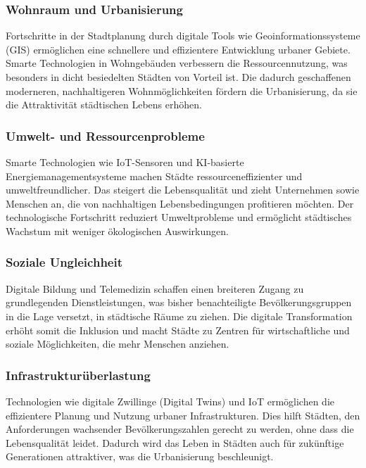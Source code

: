 \documentclass[conference,compsoc,final,a4paper, onecolumn, 11pt]{IEEEtran}
\begin{document}
\subsubsection{Wohnraum und Urbanisierung}
Fortschritte in der Stadtplanung durch digitale Tools wie Geoinformationssysteme (GIS) ermöglichen eine schnellere und effizientere Entwicklung urbaner Gebiete. 
Smarte Technologien in Wohngebäuden verbessern die Ressourcennutzung, was besonders in dicht besiedelten Städten von Vorteil ist. 
Die dadurch geschaffenen moderneren, nachhaltigeren Wohnmöglichkeiten fördern die Urbanisierung, da sie die Attraktivität städtischen Lebens erhöhen.\autocite{un_habitat_world_cities}

\subsubsection{ Umwelt- und Ressourcenprobleme}
Smarte Technologien wie \ac{IoT}-Sensoren und \ac{KI}-basierte Energiemanagementsysteme machen Städte ressourceneffizienter und umweltfreundlicher. 
Das steigert die Lebensqualität und zieht Unternehmen sowie Menschen an, die von nachhaltigen Lebensbedingungen profitieren möchten. 
Der technologische Fortschritt reduziert Umweltprobleme und ermöglicht städtisches Wachstum mit weniger ökologischen Auswirkungen.\autocite{mdpi_smart_cities_iot}

\subsubsection{Soziale Ungleichheit}
Digitale Bildung und Telemedizin schaffen einen breiteren Zugang zu grundlegenden Dienstleistungen, was bisher benachteiligte Bevölkerungsgruppen in die Lage versetzt, in städtische Räume zu ziehen. 
Die digitale Transformation erhöht somit die Inklusion und macht Städte zu Zentren für wirtschaftliche und soziale Möglichkeiten, die mehr Menschen anziehen.\autocite{xpert_digital_urbanization}

\subsubsection{ Infrastrukturüberlastung}
Technologien wie digitale Zwillinge (Digital Twins) und \ac{IoT} ermöglichen die effizientere Planung und Nutzung urbaner Infrastrukturen. 
Dies hilft Städten, den Anforderungen wachsender Bevölkerungszahlen gerecht zu werden, ohne dass die Lebensqualität leidet. 
Dadurch wird das Leben in Städten auch für zukünftige Generationen attraktiver, was die Urbanisierung beschleunigt.\autocite{mckinsey_smart_cities}
\end{document}
